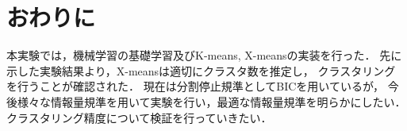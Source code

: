 \section{おわりに}
本実験では，機械学習の基礎学習及びK-means, X-meansの実装を行った．
先に示した実験結果より，X-meansは適切にクラスタ数を推定し，
クラスタリングを行うことが確認された．
現在は分割停止規準としてBICを用いているが，
今後様々な情報量規準を用いて実験を行い，最適な情報量規準を明らかにしたい．
クラスタリング精度について検証を行っていきたい．
